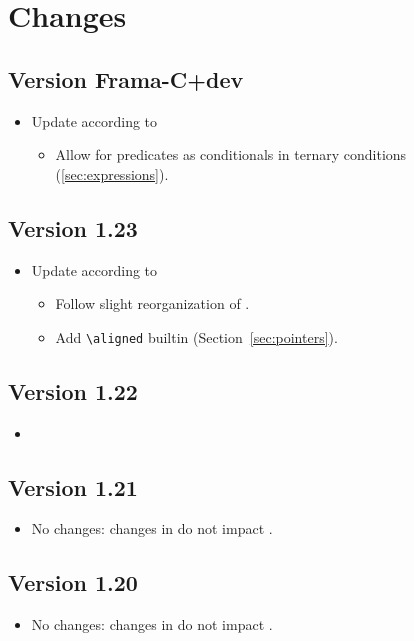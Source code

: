 \section{Changes}
\subsection*{Version Frama-C+dev}
\begin{itemize}
  \item Update according to 
    \begin{itemize}
      \item Allow for predicates as conditionals in ternary conditions (\ref{sec:expressions}).
    \end{itemize}
\end{itemize}

\subsection*{Version 1.23}
\begin{itemize}
  \item Update according to 
    \begin{itemize}
    \item Follow slight reorganization of \acsl.
    \item Add \lstinline|\aligned| builtin (Section~\ref{sec:pointers}).
    \end{itemize}
\end{itemize}

\subsection*{Version 1.22}
\begin{itemize}
  \item {}
\end{itemize}

\subsection*{Version 1.21}
\begin{itemize}
  \item No changes: changes in  do not impact \eacsl.
\end{itemize}

\subsection*{Version 1.20}
\begin{itemize}
  \item No changes: changes in  do not impact \eacsl.
\end{itemize}


